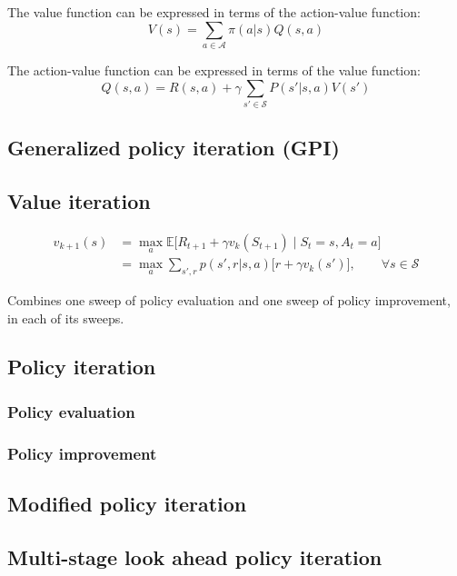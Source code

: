 The value function can be expressed in terms of the action-value function:
\begin{equation}
    V(s) = \sum_{a \in \mathcal{A}} \pi(a | s) Q(s, a)
\end{equation}

The action-value function can be expressed in terms of the value function:
\begin{equation}
    Q(s, a) = R(s, a) + \gamma \sum_{s' \in \mathcal{S}} P(s' | s, a) V(s')
\end{equation}

\subsection{Generalized policy iteration (GPI)}

\subsection{Value iteration}

\begin{equation}
    \begin{aligned}
        v_{k+1}(s)
         & =
        \max_{a} \mathbb{E} \big[ R_{t+1} + \gamma v_k(S_{t+1}) \;\big|\; S_t = s, A_t = a \big]
        \\ & =
        \max_{a} \sum_{s', r} p(s', r | s, a) \Big[ r + \gamma v_k(s') \Big]
        , \qquad \forall s \in \mathcal{S}
    \end{aligned}
\end{equation}

Combines one sweep of policy evaluation and one sweep of policy improvement, in each of its sweeps.

\subsection{Policy iteration}

\subsubsection{Policy evaluation}

\subsubsection{Policy improvement}

\subsection{Modified policy iteration}

\subsection{Multi-stage look ahead policy iteration}
